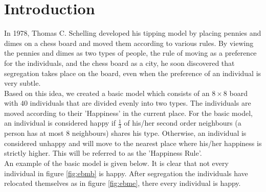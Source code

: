 \section{Introduction}
In 1978, Thomas C. Schelling developed his tipping model by placing pennies and dimes on a chess board and moved them according to various rules. 
By viewing the pennies and dimes as two types of people, the rule of moving as a preference for the individuals, and the chess board as a city, he soon discovered that segregation takes place on the board, even when the preference of an individual is very subtle.\\

Based on this idea, we created a basic model which consists of an $8\times8$ board with $40$ individuals that are divided evenly into two types. 
The individuals are moved according to their 'Happiness' in the current place. 
For the basic model, an individual is considered happy if $\frac{1}{3}$ of his/her second order neighbours (a person has at most $8$ neighbours) shares his type. 
Otherwise, an individual is considered unhappy and will move to the nearest place where  his/her happiness is strictly higher. This will be referred to as the 'Happiness Rule'.\\

An example of the basic model is given below. It is clear that not every individual in figure \ref{fig:ebmb} is happy. After segregation the individuals have relocated themselves as in figure \ref{fig:ebme}, there every individual is happy.

